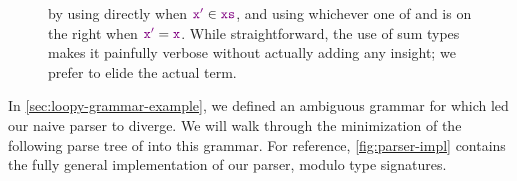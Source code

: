 \begin{figure*}
  by using  directly when $\textcolor{violet}{\texttt{x$'$}}\in \textcolor{violet}{\texttt{xs}}$, and using whichever one of  and  is on the right when $\textcolor{violet}{\texttt{x$'$}} = \textcolor{violet}{\texttt{x}}$.  While straightforward, the use of sum types makes it painfully verbose without actually adding any insight; we prefer to elide the actual term.
\end{figure*}

    In \autoref{sec:loopy-grammar-example}, we defined an ambiguous grammar for  which led our naive parser to diverge.  We will walk through the minimization of the following parse tree of  into this grammar.  For reference, \autoref{fig:parser-impl} contains the fully general implementation of our parser, modulo type signatures.


